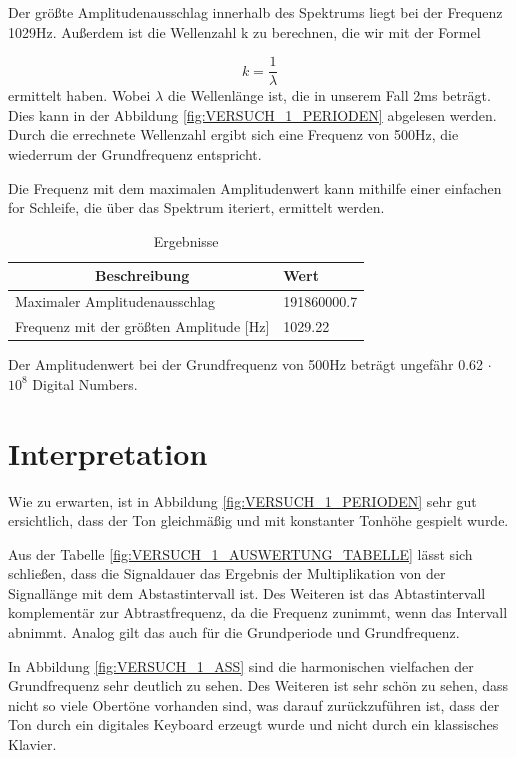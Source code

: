\documentclass[12pt, oneside, a4paper, \docLanguage]{report}
\begin{document}
Der größte Amplitudenausschlag innerhalb des Spektrums liegt bei der Frequenz 1029Hz. Außerdem ist die Wellenzahl k zu berechnen, die wir mit der Formel 

\begin{equation*}
	k = \frac{1}{\lambda}
\end{equation*}
ermittelt haben. Wobei $\lambda$ die Wellenlänge ist, die in unserem Fall 2ms beträgt. Dies kann in der Abbildung \ref{fig:VERSUCH_1_PERIODEN} abgelesen werden. Durch die errechnete Wellenzahl ergibt sich eine Frequenz von 500Hz, die wiederrum der Grundfrequenz entspricht.


Die Frequenz mit dem maximalen Amplitudenwert kann mithilfe einer einfachen for Schleife, die über das Spektrum iteriert, ermittelt werden.

\begin{table}[H]
\center
\begin{tabular}{|l|l|}
\hline
\multicolumn{1}{|c|}{\textbf{Beschreibung}}   & \textbf{Wert} \\ \hline
Maximaler Amplitudenausschlag                         & 191860000.7          \\ \hline
Frequenz mit der größten Amplitude {[}Hz{]}                        & 1029.22        \\ \hline
\end{tabular}
\caption{Ergebnisse}
\label{fig:VERSUCH_1_MAX}
\end{table}

Der Amplitudenwert bei der Grundfrequenz von 500Hz beträgt ungefähr 0.62 $\cdot$ $10^{8}$ Digital Numbers.

\newpage
\section{Interpretation}
\label{chap:VERSUCH_1_INTERPRETATION}
Wie zu erwarten, ist in Abbildung \ref{fig:VERSUCH_1_PERIODEN} sehr gut ersichtlich, dass der Ton gleichmäßig und mit konstanter Tonhöhe gespielt wurde. 

Aus der Tabelle \ref{fig:VERSUCH_1_AUSWERTUNG_TABELLE} lässt sich schließen, dass die Signaldauer das Ergebnis der Multiplikation von der Signallänge mit dem Abstastintervall ist. Des Weiteren ist das Abtastintervall komplementär zur Abtrastfrequenz, da die Frequenz zunimmt, wenn das Intervall abnimmt. Analog gilt das auch für die Grundperiode und Grundfrequenz.

In Abbildung \ref{fig:VERSUCH_1_ASS} sind die harmonischen vielfachen der Grundfrequenz sehr deutlich zu sehen.
Des Weiteren ist sehr schön zu sehen, dass nicht so viele Obertöne vorhanden sind, was darauf zurückzuführen ist, dass der Ton durch ein digitales Keyboard erzeugt wurde und nicht durch ein klassisches Klavier.
\end{document}
